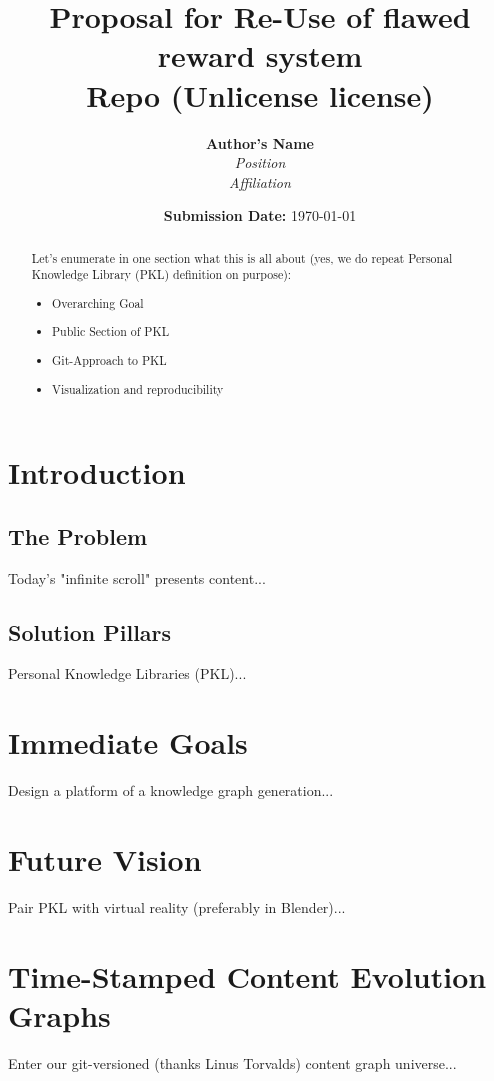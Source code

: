 \documentclass[11pt]{article}
\title{
	\vspace{2in}
	\textbf{Proposal for Re-Use of flawed reward system}\\
	\large Repo (Unlicense license)\\
	\vspace{1in}
}
\author{
	\textbf{Author's Name}\\
	\textit{Position}\\
	\textit{Affiliation}\\
	\vspace{1in}
}
\date{\textbf{Submission Date:} \today}
\begin{document}
	
	\maketitle
	\thispagestyle{empty}
	\newpage
	
	\begin{abstract}
		\noindent
		Let's enumerate in one section what this is all about (yes, we do repeat Personal Knowledge Library (PKL) definition on purpose):
		\begin{itemize}
			\item Overarching Goal
			\item Public Section of PKL
			\item Git-Approach to PKL
			\item Visualization and reproducibility
		\end{itemize}
	\end{abstract}
	\newpage
	
	\tableofcontents
	\newpage
	
	\section{Introduction}
	\subsection{The Problem}
	Today's "infinite scroll" presents content...
	
	\subsection{Solution Pillars}
	Personal Knowledge Libraries (PKL)...
	
	\section{Immediate Goals}
	Design a platform of a knowledge graph generation...
	
	\section{Future Vision}
	Pair PKL with virtual reality (preferably in Blender)...
	
	\section{Time-Stamped Content Evolution Graphs}
	Enter our git-versioned (thanks Linus Torvalds) content graph universe...
	
\end{document}

